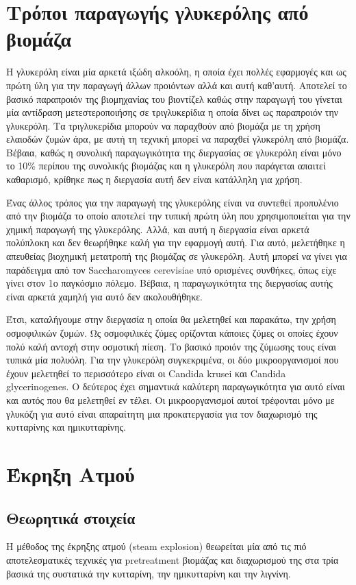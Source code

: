 \documentclass[11pt]{article}
\begin{document}
\section{Τρόποι παραγωγής γλυκερόλης από βιομάζα}
\label{sec:org1e57406}
Η γλυκερόλη είναι μία αρκετά ιξώδη αλκοόλη, η οποία έχει πολλές εφαρμογές και ως πρώτη ύλη για την παραγωγή άλλων προιόντων αλλά και αυτή καθ'αυτή. Αποτελεί το βασικό παραπροιόν της βιομηχανίας του βιοντίζελ καθώς στην παραγωγή του γίνεται μία αντίδραση μετεστεροποιήσης σε τριγλυκερίδια η οποία δίνει ως παραπροιόν την γλυκερόλη. Τα τριγλυκερίδια μπορούν να παραχθούν από βιομάζα με τη χρήση ελαιοδών ζυμών άρα, με αυτή τη τεχνική μπορεί να παραχθεί γλυκερόλη από βιομάζα. Βέβαια, καθώς η συνολική παραγωγικότητα της διεργασίας σε γλυκερόλη είναι μόνο το 10\% περίπου της συνολικής βιομάζας και η γλυκερόλη που παράγεται απαιτεί καθαρισμό, κρίθηκε πως η διεργασία αυτή δεν είναι κατάλληλη για χρήση.

Ένας άλλος τρόπος για την παραγωγή της γλυκερόλης είναι να συντεθεί προπυλένιο από την βιομάζα το οποίο αποτελεί την τυπική πρώτη ύλη που χρησιμοποιείται για την χημική παραγωγή της γλυκερόλης. Αλλά, και αυτή η διεργασία είναι αρκετά πολύπλοκη και δεν θεωρήθηκε καλή για την εφαρμογή αυτή. Για αυτό, μελετήθηκε η απευθείας βιοχημική μετατροπή της βιομάζας σε γλυκερόλη. Αυτή μπορεί να γίνει για παράδειγμα από τον Saccharomyces cerevisiae υπό ορισμένες συνθήκες, όπως είχε γίνει στον 1ο παγκόσμιο πόλεμο. Βέβαια, η παραγωγικότητα της διεργασίας αυτής είναι αρκετά χαμηλή για αυτό δεν ακολουθήθηκε.

Έτσι, καταλήγουμε στην διεργασία η οποία θα μελετηθεί και παρακάτω, την χρήση οσμοφιλικών ζυμών. Ως οσμοφιλικές ζύμες ορίζονται κάποιες ζύμες οι οποίες έχουν πολύ καλή αντοχή στην οσμοτική πίεση. Το βασικό προιόν της ζύμωσης τους είναι τυπικά μία πολυόλη. Για την γλυκερόλη συγκεκριμένα, οι δύο μικροοργανισμοί που έχουν μελετηθεί το περισσότερο είναι οι Candida krusei και Candida glycerinogenes. Ο δεύτερος έχει σημαντικά καλύτερη παραγωγικότητα για αυτό είναι και αυτός που θα μελετηθεί εν τέλει. Οι μικροοργανισμοί αυτοί τρέφονται μόνο με γλυκόζη για αυτό είναι απαραίτητη μια προκατεργασία για τον διαχωρισμό της κυτταρίνης και ημικυτταρίνης.

\section{Έκρηξη Ατμού}
\label{sec:org39d33ce}
\subsection{Θεωρητικά στοιχεία}
\label{sec:org3770475}
Η μέθοδος της έκρηξης ατμού (steam explosion) θεωρείται μία από τις πιό αποτελεσματικές τεχνικές για pretreatment βιομάζας και διαχωρισμού της στα τρία βασικά της συστατικά την κυτταρίνη, την ημικυτταρίνη και την λιγνίνη.
\end{document}
